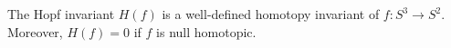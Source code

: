 The Hopf invariant $H(f)$ is a well-defined homotopy invariant of $f \colon S^{3} \to S^{2}$. Moreover, $H(f) = 0$ if $f$ is null homotopic.
